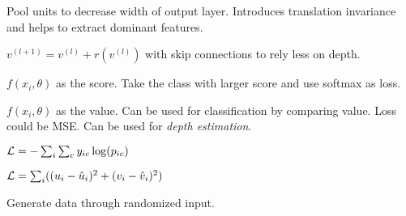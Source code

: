 \begin{definition}
  Pool units to decrease width of output layer. Introduces translation invariance and helps to extract dominant features.
\end{definition}

\begin{definition}[ResNet]
  \(v^{(l + 1)} = v^{(l)} + r(v^{(l)})\) with skip connections to rely less on depth.
\end{definition}

\begin{definition}[Classification]
  \(f(x_i, \theta)\) as the score. Take the class with larger score and use softmax as loss.
\end{definition}

\begin{definition}[Regression]
  \(f(x_i, \theta)\) as the value. Can be used for classification by comparing value. Loss could be MSE. Can be used for \textit{depth estimation}.
\end{definition}

\begin{definition}
  \(\mathcal{L} =- \sum_i \sum_c y_{ic} \log(p_{ic})\)
\end{definition}

\begin{definition}
  \(\mathcal{L} =\sum_i ((u_i -\hat{u}_i)^2 + (v_i - \hat{v}_i)^2)\)
\end{definition}

\begin{definition}[GAN]
  Generate data through randomized input.
\end{definition}
